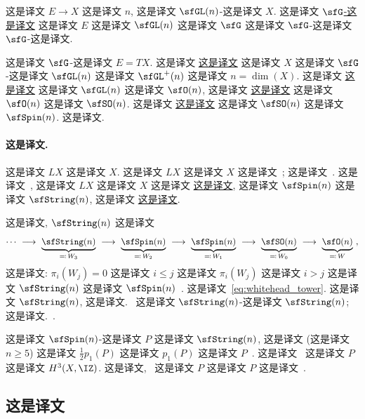 \documentclass[
    affil-it, %
    auth-lg, %
    british, %
    compression, %
    contents, %
    custom-packages={}, %
    references={bigone}, %
]{lib/preprint}
\begin{document}
\begin{body}
 这是译文 $E\rightarrow X$ 这是译文 $n$, 这是译文 $\sfGL(n)$-这是译文 $X$. 这是译文 \uline{$\sfG$-这是译文} 这是译文 $E$ 这是译文 $\sfGL(n)$ 这是译文 $\sfG$ 这是译文 $\sfG$-这是译文 $\sfG$-这是译文.
        
 这是译文 $\sfG$-这是译文 $E=TX$. 这是译文 \uline{这是译文} 这是译文 $X$ 这是译文 $\sfG$-这是译文 $\sfGL(n)$ 这是译文 $\sfGL^+(n)$ 这是译文 $n=\dim(X)$. 这是译文 \uline{这是译文} 这是译文 $\sfGL(n)$ 这是译文 $\sfO(n)$, 这是译文 \uline{这是译文} 这是译文 $\sfO(n)$ 这是译文 $\sfSO(n)$. 这是译文 \uline{这是译文} 这是译文 $\sfSO(n)$ 这是译文 $\sfSpin(n)$. 这是译文. 
        
        \paragraph{这是译文.}  这是译文 $LX$ 这是译文 $X$. 这是译文 $LX$ 这是译文 $X$ 这是译文~\cite{Witten:1987cg}; 这是译文~\cite{Killingback:1986rd,mclaughlin1992orientation}. 这是译文~\cite{mclaughlin1992orientation}, 这是译文 $LX$ 这是译文 $X$ 这是译文 \uline{这是译文}, 这是译文 $\sfSpin(n)$ 这是译文 $\sfString(n)$, 这是译文 \uline{这是译文}. 

 这是译文, $\sfString(n)$ 这是译文         \begin{equation}\label{eq:whitehead_tower}
            \cdots\ \longrightarrow\ \underbrace{\sfString(n)}_{\eqqcolon\,W_3}\ \longrightarrow\ \underbrace{\sfSpin(n)}_{\eqqcolon\,W_2}\ \longrightarrow\ \underbrace{\sfSpin(n)}_{\eqqcolon\,W_1}\ \longrightarrow\ \underbrace{\sfSO(n)}_{\eqqcolon\,W_0}\ \longrightarrow\ \underbrace{\sfO(n)}_{\eqqcolon\,W}~,
        \end{equation}  这是译文: $\pi_i(W_j)=0$ 这是译文 $i\leq j$ 这是译文 $\pi_i(W_j)$ 这是译文 $i>j$ 这是译文 $\sfString(n)$ 这是译文 $\sfSpin(n)$~\cite{Stolz:2004aa}. 这是译文~\eqref{eq:whitehead_tower}. 这是译文 $\sfString(n)$, 这是译文.~\cite{Nikolaus:2011zg} 这是译文 $\sfString(n)$-这是译文 $\sfString(n)$; 这是译文.~\cite{Demessie:2016ieh}.

 这是译文 $\sfSpin(n)$-这是译文 $P$ 这是译文 $\sfString(n)$, 这是译文 (这是译文 $n\geq 5$) 这是译文 $\tfrac12p_1(P)$ 这是译文 $p_1(P)$ 这是译文 $P$~\cite{mclaughlin1992orientation}. 这是译文~\cite[Section 5]{Stolz:2004aa} 这是译文 $P$ 这是译文 $H^3(X,\IZ)$. 这是译文,~\cite{Waldorf:2009uf} 这是译文 $P$ 这是译文 $P$ 这是译文~\cite{Carey:2004xt}.

        \subsection{这是译文}\label{app:centralExtensions}
        

\end{body}
\end{document}

